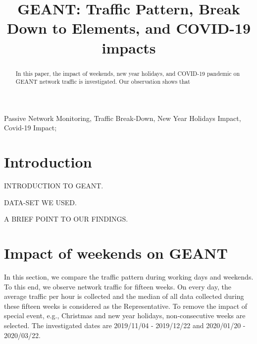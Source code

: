 \documentclass[10pt, journal, letterpaper]{IEEEtran}
\begin{document}
\title{GEANT: Traffic Pattern, Break Down to Elements, and COVID-19 impacts}
\author{}
\maketitle	
\begin{abstract}
In this paper, the impact of weekends, new year holidays, and COVID-19 pandemic on GEANT network traffic is investigated. Our observation shows that 
\end{abstract}	
\begin{IEEEkeywords} 
    Passive Network Monitoring, Traffic Break-Down, New Year Holidays Impact, Covid-19 Impact;
\end{IEEEkeywords}

\section{Introduction}
INTRODUCTION TO GEANT.

DATA-SET WE USED.

A BRIEF POINT TO OUR FINDINGS.

\section{Impact of weekends on GEANT}
In this section, we compare the traffic pattern during working days and weekends. To this end, we observe network traffic for fifteen weeks. On every day, the average traffic per hour is collected and the median of all data collected during these fifteen weeks is considered as the Representative. To remove the impact of special event, e.g., Christmas and new year holidays, non-consecutive weeks are selected. The investigated dates are 2019/11/04 - 2019/12/22 and 2020/01/20 - 2020/03/22.
\end{document}
